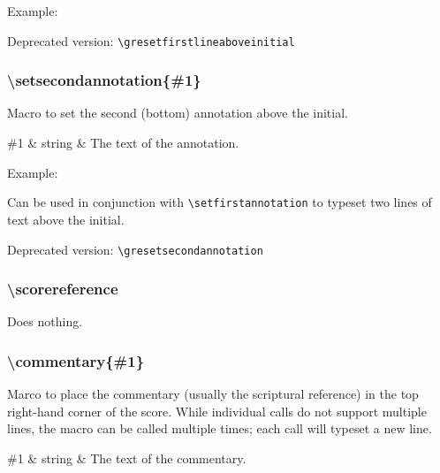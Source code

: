 Example:\par\medskip
\begin{latexcode}
\end{latexcode}

\smallskip\hskip 15pt Deprecated version: \verb=\gresetfirstlineaboveinitial=

\subsubsection*{\textbackslash setsecondannotation\{\#1\}}
Macro to set the second (bottom) annotation above the initial.

\begin{argtable}
  \#1 & string & The text of the annotation.\\
\end{argtable}

Example:\par\medskip
\begin{latexcode}
\end{latexcode}

Can be used in conjunction with \verb=\setfirstannotation= to typeset
two lines of text above the initial.

\medskip
\begin{latexcode}
\end{latexcode}

\smallskip\hskip 15pt Deprecated version: \verb=\gresetsecondannotation=

\subsubsection*{\textbackslash scorereference}
Does nothing.

\subsubsection*{\textbackslash commentary\{\#1\}}
Marco to place the commentary (usually the scriptural reference) in
the top right-hand corner of the score.  While individual calls do not
support multiple lines, the macro can be called multiple times; each
call will typeset a new line.

\begin{argtable}
  \#1 & string & The text of the commentary.\\
\end{argtable}

